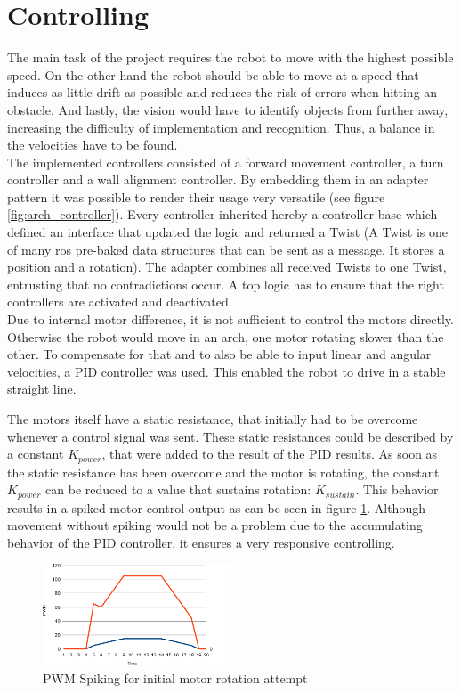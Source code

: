 \section{Controlling}

The main task of the project requires the robot to move with the highest possible speed.
On the other hand the robot should be able to move at a speed that induces as little drift as possible and reduces the risk of errors when hitting an obstacle.
And lastly, the vision would have to identify objects from further away, increasing the difficulty of implementation and recognition.
Thus, a balance in the velocities have to be found.\\

The implemented controllers consisted of a forward movement controller, a turn controller and a wall alignment controller.
By embedding them in an adapter pattern it was possible to render their usage very versatile (see figure \ref{fig:arch_controller}).
Every controller inherited hereby a controller base which defined an interface that updated the logic and returned a Twist
(A Twist is one of many ros pre-baked data structures that can be sent as a message. 
It stores a position and a rotation). 
The adapter combines all received Twists to one Twist, entrusting that no contradictions occur.
A top logic has to ensure that the right controllers are activated and deactivated.\\

Due to internal motor difference, it is not sufficient to control the motors directly.
Otherwise the robot would move in an arch, one motor rotating slower than the other.
To compensate for that and to also be able to input linear and angular velocities, a PID controller was used. 
This enabled the robot to drive in a stable straight line.

The motors itself have a static resistance, that initially had to be overcome whenever a control signal was sent.
These static resistances could be described by a constant $K_{power}$, that were added to the result of the PID results.
As soon as the static resistance has been overcome and the motor is rotating, the constant $K_{power}$ can be reduced to a value that sustains rotation: $K_{sustain}$.
This behavior results in a spiked motor control output as can be seen in figure \ref{fig:pwm_spiker}.
Although movement without spiking would not be a problem due to the accumulating behavior of the PID controller, it ensures a very responsive controlling.

\begin{figure}[h]
\begin{center}
\includegraphics[width=0.5\textwidth]{figures/pwm_spike.pdf}
\end{center}
\caption{PWM Spiking for initial motor rotation attempt}
\label{fig:pwm_spiker}
\end{figure}